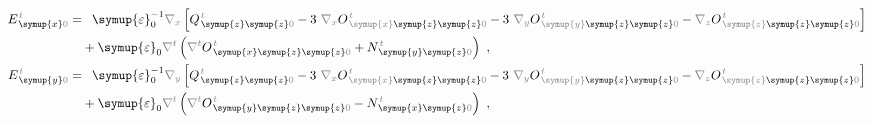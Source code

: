 \begin{subequations}
\begin{align}
	E^{\;\!\mathcolor{gray}{t}}_{\;\! \symup{x}\mathcolor{gray}{0}} = &\hphantom{+} {\symup{\varepsilon}}_0^{-1} \mathcolor{gray}{\nabla_x} \left[ Q^{\;\!\mathcolor{gray}{t}}_{\;\! \symup{z} \symup{z} \mathcolor{gray}{0}} - 3~ \mathcolor{gray}{\nabla_x} O^{\;\!\mathcolor{gray}{t}}_{\;\! \mathcolor{gray}{\symup{x}} \symup{z} \symup{z} \mathcolor{gray}{0}} - 3~ \mathcolor{gray}{\nabla_y}  O^{\;\!\mathcolor{gray}{t}}_{\;\! \mathcolor{gray}{\symup{y}} \symup{z} \symup{z} \mathcolor{gray}{0}} - \mathcolor{gray}{\nabla_z}  O^{\;\!\mathcolor{gray}{t}}_{\;\! \mathcolor{gray}{\symup{z}} \symup{z} \symup{z} \mathcolor{gray}{0}} \right] \label{eq:E_x0==} \\ &+ {\symup{\varepsilon}}_0 \mathcolor{gray}{\nabla^t} \left( \mathcolor{gray}{\nabla^t} O^{\;\!\mathcolor{gray}{t}}_{\;\!\symup{x} \symup{z} \symup{z} \mathcolor{gray}{0}} + N^{\;\!\mathcolor{gray}{t}}_{\;\! \symup{y} \symup{z} \mathcolor{gray}{0}} \right) ~, \\ E^{\;\!\mathcolor{gray}{t}}_{\;\! \symup{y}\mathcolor{gray}{0}} = &\hphantom{+} {\symup{\varepsilon}}_0^{-1} \mathcolor{gray}{\nabla_y} \left[ Q^{\;\!\mathcolor{gray}{t}}_{\;\! \symup{z} \symup{z} \mathcolor{gray}{0}} - 3~ \mathcolor{gray}{\nabla_x} O^{\;\!\mathcolor{gray}{t}}_{\;\! \mathcolor{gray}{\symup{x}} \symup{z} \symup{z} \mathcolor{gray}{0}} - 3~ \mathcolor{gray}{\nabla_y}  O^{\;\!\mathcolor{gray}{t}}_{\;\! \mathcolor{gray}{\symup{y}} \symup{z} \symup{z} \mathcolor{gray}{0}} - \mathcolor{gray}{\nabla_z}  O^{\;\!\mathcolor{gray}{t}}_{\;\! \mathcolor{gray}{\symup{z}} \symup{z} \symup{z} \mathcolor{gray}{0}} \right] \label{eq:E_y0==} \\ &+ {\symup{\varepsilon}}_0 \mathcolor{gray}{\nabla^t} \left( \mathcolor{gray}{\nabla^t} O^{\;\!\mathcolor{gray}{t}}_{\;\! \symup{y} \symup{z} \symup{z} \mathcolor{gray}{0}} - N^{\;\!\mathcolor{gray}{t}}_{\;\! \symup{x} \symup{z} \mathcolor{gray}{0}} \right) ~, \\

\end{align}
\end{subequations}
